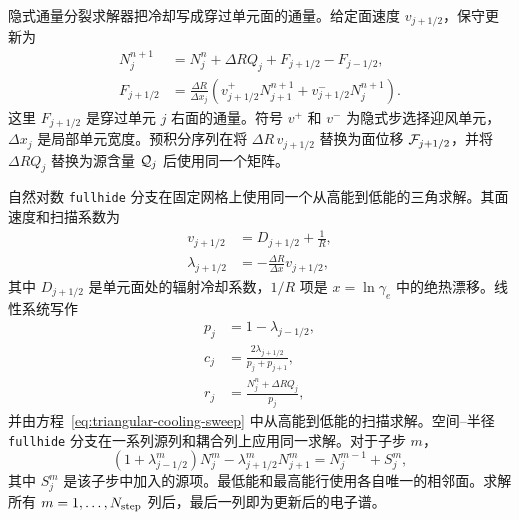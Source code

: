 \documentclass[twocolumn]{aastex702}
\begin{document}
隐式通量分裂求解器把冷却写成穿过单元面的通量。给定面速度 \(v_{j+1/2}\)，保守更新为
\begin{equation}
\begin{aligned}
N_j^{n+1}&=N_j^n+\Delta RQ_j+F_{j+1/2}-F_{j-1/2},\\
F_{j+1/2}&=\frac{\Delta R}{\Delta x_j}
\left(v_{j+1/2}^{+}N_{j+1}^{n+1}
+v_{j+1/2}^{-}N_j^{n+1}\right).
\end{aligned}
\end{equation}
这里 \(F_{j+1/2}\) 是穿过单元 \(j\) 右面的通量。符号 \(v^+\) 和 \(v^-\) 为隐式步选择迎风单元，\(\Delta x_j\) 是局部单元宽度。预积分序列在将 \(\Delta R\,v_{j+1/2}\) 替换为面位移 \({\cal F}_{j+1/2}\)，并将 \(\Delta RQ_j\) 替换为源含量 \({\cal Q}_j\) 后使用同一个矩阵。

自然对数 \texttt{fullhide} 分支在固定网格上使用同一个从高能到低能的三角求解。其面速度和扫描系数为
\begin{equation}
\begin{aligned}
v_{j+1/2}&=D_{j+1/2}+\frac{1}{R},\\
\lambda_{j+1/2}&=-\frac{\Delta R}{\Delta x}v_{j+1/2},
\end{aligned}
\end{equation}
其中 \(D_{j+1/2}\) 是单元面处的辐射冷却系数，\(1/R\) 项是 \(x=\ln\gamma_e\) 中的绝热漂移。线性系统写作
\begin{equation}
\begin{aligned}
p_j&=1-\lambda_{j-1/2},\\
c_j&=\frac{2\lambda_{j+1/2}}{p_j+p_{j+1}},\\
r_j&=\frac{N_j^n+\Delta RQ_j}{p_j},
\end{aligned}
\end{equation}
并由方程~\eqref{eq:triangular-cooling-sweep} 中从高能到低能的扫描求解。空间--半径 \texttt{fullhide} 分支在一系列源列和耦合列上应用同一求解。对于子步 \(m\)，
\begin{equation}
(1+\lambda_{j-1/2}^{m})N_j^{m}
-\lambda_{j+1/2}^{m}N_{j+1}^{m}
=N_j^{m-1}+S_j^{m},
\end{equation}
其中 \(S_j^m\) 是该子步中加入的源项。最低能和最高能行使用各自唯一的相邻面。求解所有 \(m=1,\ldots,N_{\rm step}\) 列后，最后一列即为更新后的电子谱。
\end{document}
